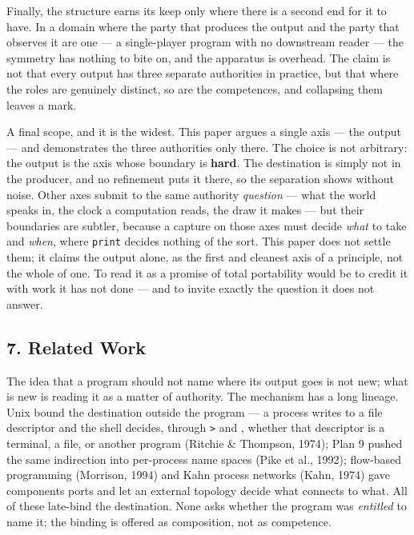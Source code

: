 \documentclass[
]{article}
\begin{document}
Finally, the structure earns its keep only where there is a second end
for it to have. In a domain where the party that produces the output and
the party that observes it are one --- a single-player program with no
downstream reader --- the symmetry has nothing to bite on, and the
apparatus is overhead. The claim is not that every output has three
separate authorities in practice, but that where the roles are genuinely
distinct, so are the competences, and collapsing them leaves a mark.

A final scope, and it is the widest. This paper argues a single axis ---
the output --- and demonstrates the three authorities only there. The
choice is not arbitrary: the output is the axis whose boundary is
\textbf{hard}. The destination is simply not in the producer, and no
refinement puts it there, so the separation shows without noise. Other
axes submit to the same authority \emph{question} --- what the world
speaks in, the clock a computation reads, the draw it makes --- but
their boundaries are subtler, because a capture on those axes must
decide \emph{what} to take and \emph{when}, where \texttt{print} decides
nothing of the sort. This paper does not settle them; it claims the
output alone, as the first and cleanest axis of a principle, not the
whole of one. To read it as a promise of total portability would be to
credit it with work it has not done --- and to invite exactly the
question it does not answer.

\subsection{7. Related Work}\label{related-work}

The idea that a program should not name where its output goes is not
new; what is new is reading it as a matter of authority. The mechanism
has a long lineage. Unix bound the destination outside the program --- a
process writes to a file descriptor and the shell decides, through
\texttt{\textgreater{}} and \texttt{\textbar{}}, whether that descriptor
is a terminal, a file, or another program (Ritchie \& Thompson, 1974);
Plan 9 pushed the same indirection into per-process name spaces (Pike et
al., 1992); flow-based programming (Morrison, 1994) and Kahn process
networks (Kahn, 1974) gave components ports and let an external topology
decide what connects to what. All of these late-bind the destination.
None asks whether the program was \emph{entitled} to name it; the
binding is offered as composition, not as competence.
\end{document}
